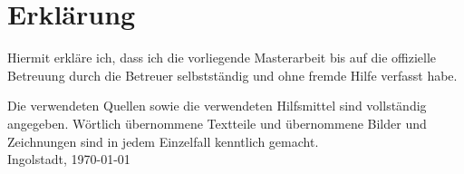 



\chapter*{Erkl\"{a}rung}
Hiermit erkl\"{a}re ich, dass ich die vorliegende Masterarbeit bis auf die offizielle Betreuung durch die Betreuer selbstst\"{a}ndig und ohne fremde Hilfe verfasst habe.\par
Die verwendeten Quellen sowie die verwendeten Hilfsmittel sind vollst\"{a}ndig angegeben. W\"{o}rtlich \"{u}bernommene Textteile und \"{u}bernommene Bilder und Zeichnungen sind in jedem Einzelfall kenntlich gemacht. \\[10ex]
Ingolstadt, \today
{}





